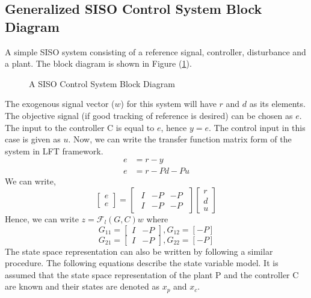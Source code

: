 \documentclass[a4paper,12pt]{article}
\begin{document}
			\subsection{Generalized SISO Control System Block Diagram} A simple SISO system consisting of a reference signal, controller, disturbance and a plant. The block diagram is shown in Figure (\ref{simple_siso}).
				\begin{figure}[H]
 
			  \centering
			  
			  
			  \caption{A SISO Control System Block Diagram}
			 \label{simple_siso}
		\end{figure}
			 The exogenous signal vector ($w$) for this system will have $r$ and $d$ as its elements. The objective signal (if good tracking of reference is desired) can be chosen as $e$. The input to the controller C is equal to $e$, hence $y=e$. The control input in this case is given as $u$. Now, we can write the transfer function matrix form of the system in LFT framework. 
				\begin{align}
					e&=r-y\\
					e&=r-Pd-Pu
				\end{align}	
				We can write,
				\[
				\begin{bmatrix}
				e\\ \hline e 
				\end{bmatrix}				
				=
				\begin{bmatrix}
				\begin{array}{cc|c}
				I & -P & -P\\
				\hline
				I & -P & -P
				\end{array}
				\end{bmatrix}
				\begin{bmatrix}
				r\\d\\ \hline u
				\end{bmatrix}
				\]
				Hence, we can write $z=\mathscr{F}_{l}(G,C)w$ where \[G_{11} =\begin{bmatrix}
				I & -P
				\end{bmatrix}, G_{12}=[-P]\] \[G_{21} =\begin{bmatrix}
				I & -P
				\end{bmatrix}, G_{22}=[-P]\] 
				The state space representation can also be written by following a similar procedure. The following equations describe the state variable model. It is assumed that the state space representation of the plant P and the controller C are known and their states are denoted as $x_{p}$ and $x_{c}$.
\end{document}
